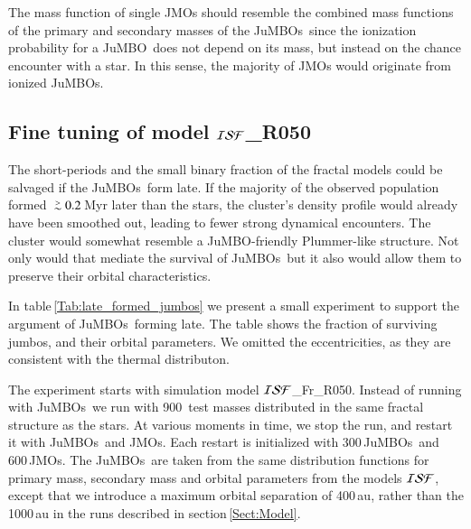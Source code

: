 \documentclass[submission,phys]{lib/SciPost}
\def\apgt{\ {\raise-.5ex\hbox{$\buildrel>\over\sim$}}\ }
\newcommand{\jumbo}{\mbox{JuMBO}}
\newcommand{\jumbos}{\mbox{JuMBOs}}
\begin{document}
The mass function of single JMOs should resemble the combined mass functions 
of the primary and secondary masses of the \jumbos\, since the ionization 
probability for a \jumbo\, does not depend on its mass, but instead on the 
chance encounter with a star. In this sense, the majority of JMOs would originate
from ionized \jumbos.  


\subsection{Fine tuning of model ${\cal ISF}$\_R050}\label{Sect:Disc:finetuning}

The short-periods and the small binary fraction of the fractal models
could be salvaged if the \jumbos\, form late. If the majority of the
observed population formed $\apgt 0.2$\,Myr later than the stars, the
cluster's density profile would already have been smoothed out,
leading to fewer strong dynamical encounters. The cluster would
somewhat resemble a \jumbo -friendly Plummer-like structure. Not only
would that mediate the survival of \jumbos\, but it also would allow
them to preserve their orbital characteristics.

In table\,\ref{Tab:late_formed_jumbos} we present a small experiment
to support the argument of \jumbos\, forming late.  The table shows the
fraction of surviving jumbos, and their orbital parameters. We omitted
the eccentricities, as they are consistent with the thermal
distributon.

The experiment starts with simulation model ${\cal ISF}$\_Fr\_R050.
Instead of running with \jumbos\, we run with 900\, test masses
distributed in the same fractal structure as the stars.  At various
moments in time, we stop the run, and restart it with \jumbos\, and
JMOs.  Each restart is initialized with 300\,\jumbos\, and 600\,JMOs.
The \jumbos\, are taken from the same distribution functions for
primary mass, secondary mass and orbital parameters from the models
${\cal ISF}$, except that we introduce a maximum orbital separation of
400\,au, rather than the 1000\,au in the runs described in
section\,\ref{Sect:Model}.
\end{document}

